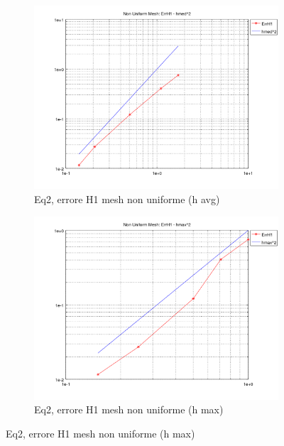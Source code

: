 \documentclass[12pt,a4paper]{report}
\theoremstyle{theorem}
\theoremstyle{theorem}
\theoremstyle{definition}
\begin{document}
\begin{figure}[!h]
	\centering
	\begin{subfigure}[b]{0.49\textwidth}
    		\includegraphics[width=\textwidth]{Eq2-H1avg.png}
		\caption{Eq2, errore H1 mesh non uniforme (h avg)}

    	\end{subfigure}
    	\begin{subfigure}[b]{0.49\textwidth}
    		\includegraphics[width=\textwidth]{Eq2-H1max.png}
    		\caption{Eq2, errore H1 mesh non uniforme (h max)}
    	\end{subfigure}
\end{figure}




\printindex

% 

%

\end{document}
